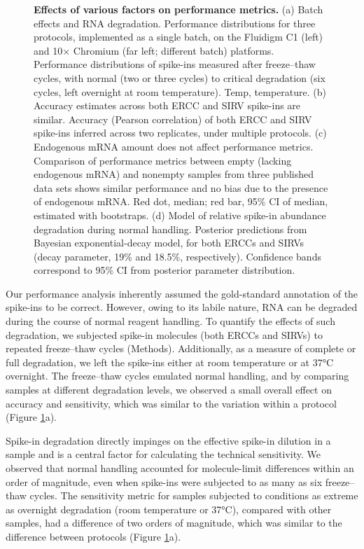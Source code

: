 \begin{figure}
    \caption[Effects of various factors on performance metrics]{\textbf{Effects of various factors on performance metrics.} (a) Batch effects and RNA degradation. Performance distributions for three protocols, implemented as a single batch, on the Fluidigm C1 (left) and 10× Chromium (far left; different batch) platforms. Performance distributions of spike-ins measured after freeze–thaw cycles, with normal (two or three cycles) to critical degradation (six cycles, left overnight at room temperature). Temp, temperature. (b) Accuracy estimates across both ERCC and SIRV spike-ins are similar. Accuracy (Pearson correlation) of both ERCC and SIRV spike-ins inferred across two replicates, under multiple protocols. (c) Endogenous mRNA amount does not affect performance metrics. Comparison of performance metrics between empty (lacking endogenous mRNA) and nonempty samples from three published data sets shows similar performance and no bias due to the presence of endogenous mRNA. Red dot, median; red bar, 95\% CI of median, estimated with bootstraps. (d) Model of relative spike-in abundance degradation during normal handling. Posterior predictions from Bayesian exponential-decay model, for both ERCCs and SIRVs (decay parameter, 19\% and 18.5\%, respectively). Confidence bands correspond to 95\% CI from posterior parameter distribution.}
    \label{fig:alternative-factors}
\end{figure}

Our performance analysis inherently assumed the gold-standard annotation of the spike-ins to be correct. However, owing to its labile nature, RNA can be degraded during the course of normal reagent handling. To quantify the effects of such degradation, we subjected spike-in molecules (both ERCCs and SIRVs) to repeated freeze–thaw cycles (Methods). Additionally, as a measure of complete or full degradation, we left the spike-ins either at room temperature or at 37°C overnight. The freeze–thaw cycles emulated normal handling, and by comparing samples at different degradation levels, we observed a small overall effect on accuracy and sensitivity, which was similar to the variation within a protocol (Figure \ref{fig:alternative-factors}a).

Spike-in degradation directly impinges on the effective spike-in dilution in a sample and is a central factor for calculating the technical sensitivity. We observed that normal handling accounted for molecule-limit differences within an order of magnitude, even when spike-ins were subjected to as many as six freeze–thaw cycles. The sensitivity metric for samples subjected to conditions as extreme as overnight degradation (room temperature or 37°C), compared with other samples, had a difference of two orders of magnitude, which was similar to the difference between protocols (Figure \ref{fig:alternative-factors}a).

